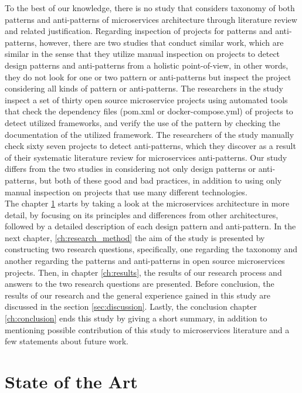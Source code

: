 \documentclass{Configuration_Files/PoliMi3i_thesis}
\begin{document}
To the best of our knowledge, there is no study that considers taxonomy of both patterns and anti-patterns of microservices architecture through literature review and related justification.
Regarding inspection of projects for patterns and anti-patterns, however, there are two studies that conduct similar work, which are similar in the sense that they utilize manual inspection on projects to detect design patterns and anti-patterns from a holistic point-of-view, in other words, they do not look for one or two pattern or anti-patterns but inspect the project considering all kinds of pattern or anti-patterns.
The researchers in the study \cite{8719492} inspect a set of thirty open source microservice projects using automated tools that check the dependency files (pom.xml or docker-compose.yml) of projects to detect utilized frameworks, and verify the use of the pattern by checking the documentation of the utilized framework.
The researchers of the study \cite{10.1145/3424771.3424812} manually check sixty seven projects to detect anti-patterns, which they discover as a result of their systematic literature review for microservices anti-patterns.
Our study differs from the two studies in considering not only design patterns or anti-patterns, but both of these good and bad practices, in addition to using only manual inspection on projects that use many different technologies.
\\
The chapter \ref{ch:art} starts by taking a look at the microservices architecture in more detail, by focusing on its principles and differences from other architectures, followed by a detailed description of each design pattern and anti-pattern.
In the next chapter, \ref{ch:research_method} the aim of the study is presented by constructing two research questions, specifically, one regarding the taxonomy and another regarding the patterns and anti-patterns in open source microservices projects.
Then, in chapter \ref{ch:results}, the results of our research process and answers to the two research questions are presented.
Before conclusion, the results of our research and the general experience gained in this study are discussed in the section \ref{sec:discussion}.
Lastly, the conclusion chapter \ref{ch:conclusion} ends this study by giving a short summary, in addition to mentioning possible contribution of this study to microservices literature and a few statements about future work.

\chapter{State of the Art}
\label{ch:art}%
\end{document}
